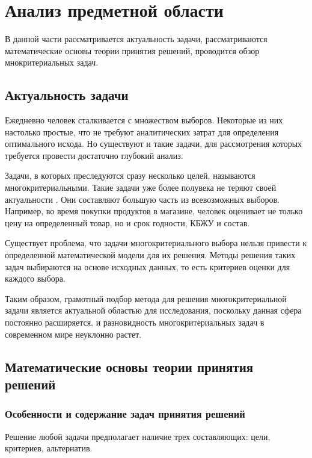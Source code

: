 \chapter{Анализ предметной области}

В данной части рассматривается актуальность задачи, рассматриваются математические основы теории принятия решений, проводится обзор мнокритериальных задач.


\section{Актуальность задачи}

Ежедневно человек сталкивается с множеством выборов. Некоторые из них настолько простые, что не требуют аналитических затрат для определения оптимального исхода. Но существуют и такие задачи, для рассмотрения которых требуется провести достаточно глубокий анализ.

Задачи, в которых преследуются сразу несколько целей, называются многокритериальными. Такие задачи уже более полувека не теряют своей актуальности \cite{bib19}. Они составляют большую часть из всевозможных выборов. Например, во время покупки продуктов в магазине, человек оценивает не только цену на определенный товар, но и срок годности, КБЖУ и состав.

Существует проблема, что задачи многокритериального выбора нельзя привести к определенной математической модели для их решения. Методы решения таких задач выбираются на основе исходных данных, то есть критериев оценки для каждого выбора. \cite{bib18}

Таким образом, грамотный подбор метода для решения многокритериальной задачи является актуальной областью для исследования, поскольку данная сфера постоянно расширяется, и разновидность многокритериальных задач в современном мире неуклонно растет. 

\section{Математические основы теории принятия решений}
\subsection{Особенности и содержание задач принятия решений}
\par Решение любой задачи предполагает наличие трех составляющих: цели, критериев, альтернатив.

